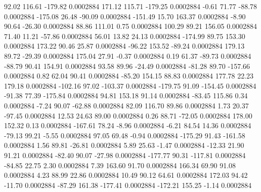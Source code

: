        92.02      116.61     -179.82     0.0002884
      171.12      115.71     -179.25     0.0002884
       -0.61       71.77      -88.78     0.0002884
     -175.08       26.48      -90.09     0.0002884
     -151.49       15.70      163.37     0.0002884
       -8.90       90.64      -26.30     0.0002884
       88.86      111.01        0.75     0.0002884
      100.29       89.21      156.05     0.0002884
       71.40       11.21      -57.86     0.0002884
       56.01       13.82       24.13     0.0002884
     -174.99       89.75      153.30     0.0002884
      173.22       90.46       25.87     0.0002884
      -96.22      153.52      -89.24     0.0002884
      179.13       89.72      -29.39     0.0002884
      175.04       27.91       -0.37     0.0002884
        0.19       61.37      -89.73     0.0002884
      -88.79       90.41      154.91     0.0002884
       93.58       89.96      -24.49     0.0002884
      -81.28       89.70     -157.66     0.0002884
        0.82       62.04       90.41     0.0002884
      -85.20      154.15       88.83     0.0002884
      177.78       22.23      179.18     0.0002884
     -102.16       97.02     -103.37     0.0002884
     -179.75       91.09     -154.45     0.0002884
      -91.38       77.39     -175.84     0.0002884
       94.81      153.18       91.14     0.0002884
      -83.45      115.86        0.34     0.0002884
       -7.24       90.07      -62.88     0.0002884
       82.09      116.70       89.86     0.0002884
        1.73       20.37      -97.45     0.0002884
       12.53       24.63       89.00     0.0002884
        0.26       88.71      -72.05     0.0002884
      178.00      152.32        0.13     0.0002884
     -167.61       78.24       -8.96     0.0002884
       -6.21       84.54       14.36     0.0002884
      -79.13       99.21       -5.55     0.0002884
       97.05       69.48       -0.94     0.0002884
     -175.29       91.43     -161.58     0.0002884
        1.56       89.81      -26.81     0.0002884
        5.89       25.63       -1.47     0.0002884
      -12.33       21.90       91.21     0.0002884
      -82.40       90.07      -27.98     0.0002884
     -177.77       90.31     -117.81     0.0002884
      -84.85       22.75        2.30     0.0002884
        7.39      163.60       91.70     0.0002884
      166.34       69.90       91.08     0.0002884
        4.23       88.99       22.86     0.0002884
       10.49       90.12       64.61     0.0002884
      172.03       94.42      -11.70     0.0002884
      -87.29      161.38     -177.41     0.0002884
     -172.21      155.25       -1.14     0.0002884
